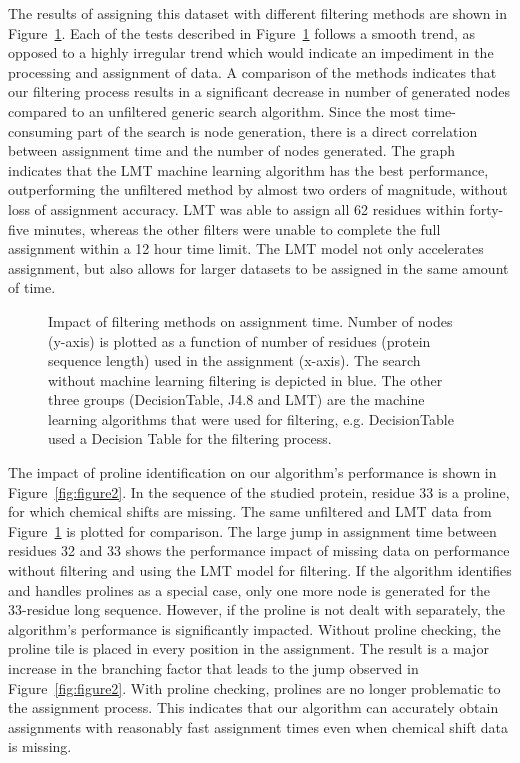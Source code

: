 \documentclass{article}
\begin{document}
\indent The results of assigning this dataset with different filtering methods are shown in Figure~\ref{fig:figure1}. Each of the tests described in Figure~\ref{fig:figure1} follows a smooth trend, as opposed to a highly irregular trend which would indicate an impediment in the processing and assignment of data. A comparison of the methods indicates that our filtering process results in a significant decrease in number of generated nodes compared to an unfiltered generic search algorithm. Since the most time-consuming part of the search is node generation, there is a direct correlation between assignment time and the number of nodes generated. The graph indicates that the LMT machine learning algorithm has the best performance, outperforming the unfiltered method by almost two orders of magnitude, without loss of assignment accuracy. LMT was able to assign all 62 residues within forty-five minutes, whereas the other filters were unable to complete the full assignment within a 12 hour time limit. The LMT model not only accelerates assignment, but also allows for larger datasets to be assigned in the same amount of time. 

\begin{figure}[H]
	\begin{center}
		\resizebox{!}{0.6\textwidth}{}
	\caption{Impact of filtering methods on assignment time. Number of nodes (y-axis) is plotted as a function of number of residues (protein sequence length) used in the assignment (x-axis). The search without machine learning filtering is depicted in blue. The other three groups (DecisionTable, J4.8 and LMT) are the machine learning algorithms that were used for filtering, e.g. DecisionTable used a Decision Table for the filtering process.}
	\label{fig:figure1}
	\end{center}
\end{figure}

\indent The impact of proline identification on our algorithm's performance is shown in Figure~\ref{fig:figure2}. In the sequence of the studied protein, residue 33 is a proline, for which chemical shifts are missing. The same unfiltered and LMT data from Figure~\ref{fig:figure1} is plotted for comparison. The large jump in assignment time between residues 32 and 33 shows the performance impact of missing data on performance without filtering and using the LMT model for filtering. If the algorithm identifies and handles prolines as a special case, only one more node is generated for the 33-residue long sequence. However, if the proline is not dealt with separately, the algorithm's performance is significantly impacted. Without proline checking, the proline tile is placed in every position in the assignment. The result is a major increase in the branching factor that leads to the jump observed in Figure~\ref{fig:figure2}. With proline checking, prolines are no longer problematic to the assignment process. This indicates that our algorithm can accurately obtain assignments with reasonably fast assignment times even when chemical shift data is missing. 
\end{document}
